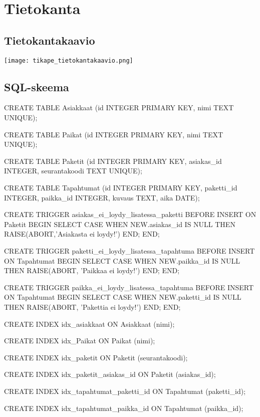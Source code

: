 \documentclass{scrartcl}
\begin{document}
\section{Tietokanta}

\subsection{Tietokantakaavio}

\begin{center}
\texttt{[image: tikape\_tietokantakaavio.png]}
\end{center}

\subsection{SQL-skeema}

\begin{code}
  CREATE TABLE Asiakkaat (id INTEGER PRIMARY KEY, nimi TEXT UNIQUE);

  CREATE TABLE Paikat (id INTEGER PRIMARY KEY, nimi TEXT UNIQUE);

  CREATE TABLE Paketit (id INTEGER PRIMARY KEY, asiakas_id INTEGER,
  seurantakoodi TEXT UNIQUE);

  CREATE TABLE Tapahtumat (id INTEGER PRIMARY KEY, paketti_id INTEGER,
  paikka_id INTEGER, kuvaus TEXT, aika DATE);

  CREATE TRIGGER asiakas_ei_loydy_lisatessa_paketti BEFORE INSERT ON
  Paketit BEGIN SELECT CASE WHEN NEW.asiakas_id IS NULL THEN
  RAISE(ABORT,'Asiakasta ei loydy!') END; END;

  CREATE TRIGGER paketti_ei_loydy_lisatessa_tapahtuma BEFORE INSERT ON
  Tapahtumat BEGIN SELECT CASE WHEN NEW.paikka_id IS NULL THEN
  RAISE(ABORT, 'Paikkaa ei loydy!') END; END;

  CREATE TRIGGER paikka_ei_loydy_lisatessa_tapahtuma BEFORE INSERT ON
  Tapahtumat BEGIN SELECT CASE WHEN NEW.paketti_id IS NULL THEN
  RAISE(ABORT, 'Pakettia ei loydy!') END; END;

  CREATE INDEX idx_asiakkaat ON Asiakkaat (nimi);

  CREATE INDEX idx_Paikat ON Paikat (nimi);

  CREATE INDEX idx_paketit ON Paketit (seurantakoodi);

  CREATE INDEX idx_paketit_asiakas_id ON Paketit (asiakas_id);

  CREATE INDEX idx_tapahtumat_paketti_id ON Tapahtumat (paketti_id);

  CREATE INDEX idx_tapahtumat_paikka_id ON Tapahtumat (paikka_id);
\end{code}
\end{document}
